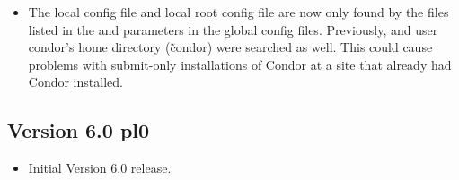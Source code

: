 \begin{itemize}
\item The local config file and local root config file are now only
found by the files listed in the  and
 parameters in the global config
files.
Previously,  and user condor's home directory
(\~condor) were searched as well.
This could cause problems with submit-only installations of Condor at
a site that already had Condor installed.

\end{itemize}

\subsection{\label{sec:New-6-0-pl0}Version 6.0 pl0}

\begin{itemize}

\item Initial Version 6.0 release.

\end{itemize}
